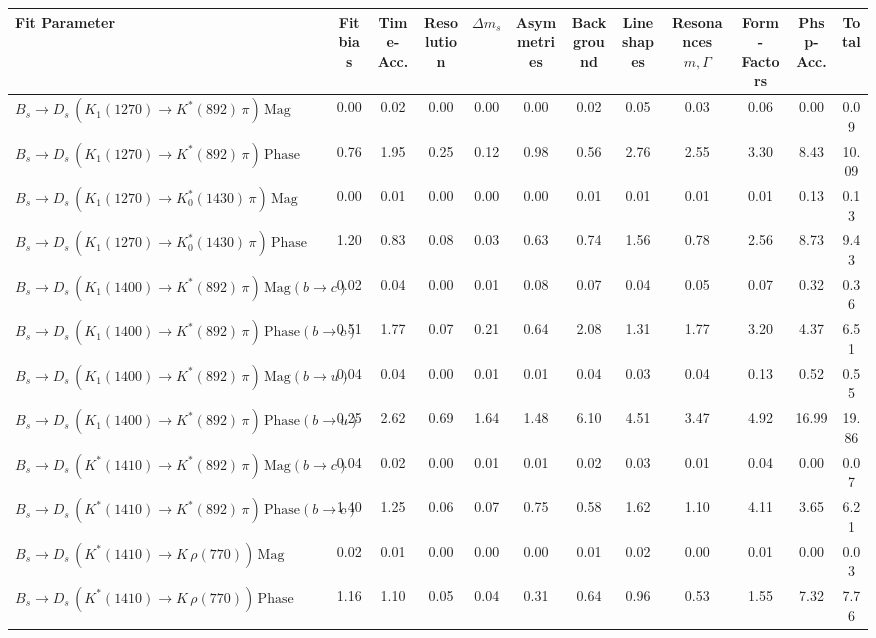 \begin{tabular}{l  c  c  c  c  c  c  c  c  c  c  | c }
\hline
\hline
Fit Parameter & Fit bias & Time-Acc. & Resolution & $\Delta m_{s}$ & Asymmetries & Background & Lineshapes & Resonances $m,\Gamma$ & Form-Factors & Phsp-Acc. &  Total  \\ 
\hline
$B_s \to D_s \, ( K_1(1270) \to K^{*}(892) \, \pi ) \, \text{Mag}$ & 0.00 & 0.02 & 0.00 & 0.00 & 0.00 & 0.02 & 0.05 & 0.03 & 0.06 & 0.00 & 0.09 \\ 
$B_s \to D_s \, ( K_1(1270) \to K^{*}(892) \, \pi ) \, \text{Phase}$ & 0.76 & 1.95 & 0.25 & 0.12 & 0.98 & 0.56 & 2.76 & 2.55 & 3.30 & 8.43 & 10.09 \\ 
$B_s \to D_s \, ( K_1(1270) \to K^{*}_{0}(1430) \, \pi ) \, \text{Mag} $ & 0.00 & 0.01 & 0.00 & 0.00 & 0.00 & 0.01 & 0.01 & 0.01 & 0.01 & 0.13 & 0.13 \\ 
$B_s \to D_s \, ( K_1(1270) \to K^{*}_{0}(1430) \, \pi ) \, \text{Phase} $ & 1.20 & 0.83 & 0.08 & 0.03 & 0.63 & 0.74 & 1.56 & 0.78 & 2.56 & 8.73 & 9.43 \\ 
$B_s \to D_s \, ( K_1(1400) \to K^{*}(892) \, \pi ) \, \text{Mag} (b \to c)$ & 0.02 & 0.04 & 0.00 & 0.01 & 0.08 & 0.07 & 0.04 & 0.05 & 0.07 & 0.32 & 0.36 \\ 
$B_s \to D_s \, ( K_1(1400) \to K^{*}(892) \, \pi ) \, \text{Phase} (b \to c)$ & 0.51 & 1.77 & 0.07 & 0.21 & 0.64 & 2.08 & 1.31 & 1.77 & 3.20 & 4.37 & 6.51 \\ 
$B_s \to D_s \, ( K_1(1400) \to K^{*}(892) \, \pi ) \, \text{Mag} (b \to u)$ & 0.04 & 0.04 & 0.00 & 0.01 & 0.01 & 0.04 & 0.03 & 0.04 & 0.13 & 0.52 & 0.55 \\ 
$B_s \to D_s \, ( K_1(1400) \to K^{*}(892) \, \pi ) \, \text{Phase} (b \to u)$ & 0.25 & 2.62 & 0.69 & 1.64 & 1.48 & 6.10 & 4.51 & 3.47 & 4.92 & 16.99 & 19.86 \\ 
$B_s \to D_s \, ( K^{*}(1410) \to K^{*}(892) \, \pi ) \, \text{Mag} (b \to c)$ & 0.04 & 0.02 & 0.00 & 0.01 & 0.01 & 0.02 & 0.03 & 0.01 & 0.04 & 0.00 & 0.07 \\ 
$B_s \to D_s \, ( K^{*}(1410) \to K^{*}(892) \, \pi ) \, \text{Phase} (b \to c)$ & 1.40 & 1.25 & 0.06 & 0.07 & 0.75 & 0.58 & 1.62 & 1.10 & 4.11 & 3.65 & 6.21 \\ 
$B_s \to D_s \, ( K^{*}(1410) \to K \, \rho(770) ) \, \text{Mag}$ & 0.02 & 0.01 & 0.00 & 0.00 & 0.00 & 0.01 & 0.02 & 0.00 & 0.01 & 0.00 & 0.03 \\ 
$B_s \to D_s \, ( K^{*}(1410) \to K \, \rho(770) ) \, \text{Phase}$ & 1.16 & 1.10 & 0.05 & 0.04 & 0.31 & 0.64 & 0.96 & 0.53 & 1.55 & 7.32 & 7.76 \\ 

\end{tabular}
